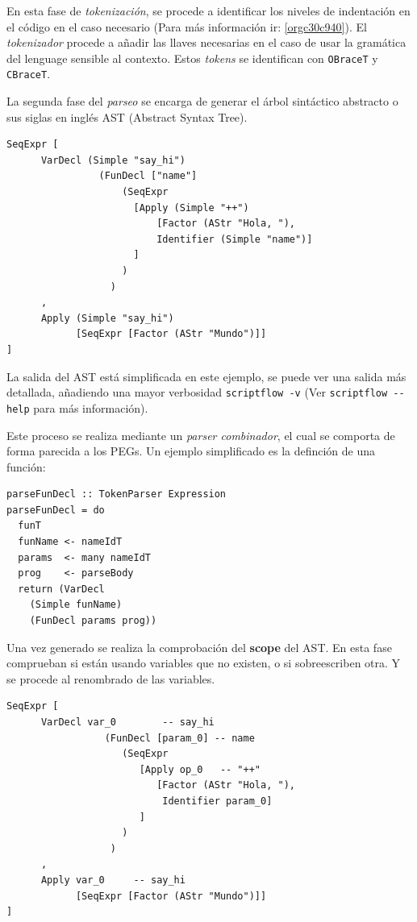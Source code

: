 \documentclass[11pt]{article}
\begin{document}
En esta fase de \emph{tokenización}, se procede a identificar los niveles de
indentación en el código en el caso necesario (Para más información ir: \ref{orgc30c940}).
El \emph{tokenizador} procede a añadir las llaves necesarias en el caso de usar la
gramática del lenguage sensible al contexto. Estos \emph{tokens} se identifican con
\texttt{OBraceT} y \texttt{CBraceT}.

La segunda fase del \emph{parseo} se encarga de generar el árbol sintáctico
abstracto o sus siglas en inglés AST (Abstract Syntax Tree).

\begin{verbatim}
SeqExpr [
      VarDecl (Simple "say_hi")
                (FunDecl ["name"]
                    (SeqExpr
                      [Apply (Simple "++")
                          [Factor (AStr "Hola, "),
                          Identifier (Simple "name")]
                      ]
                    )
                  )
      ,
      Apply (Simple "say_hi")
            [SeqExpr [Factor (AStr "Mundo")]]
]
\end{verbatim}

La salida del AST está simplificada en este ejemplo, se puede ver una salida más detallada,
añadiendo una mayor verbosidad \texttt{scriptflow -v} (Ver \texttt{scriptflow -{}-help} para más información).

Este proceso se realiza mediante un \emph{parser combinador}, el cual se comporta de
forma parecida a los PEGs. Un ejemplo simplificado es la definción de
una función:

\begin{verbatim}
parseFunDecl :: TokenParser Expression
parseFunDecl = do
  funT
  funName <- nameIdT
  params  <- many nameIdT
  prog    <- parseBody
  return (VarDecl
    (Simple funName)
    (FunDecl params prog))
\end{verbatim}

Una vez generado se realiza la comprobación del \textbf{scope} del AST. En esta fase
comprueban si están usando variables que no existen, o si sobreescriben
otra. Y se procede al renombrado de las variables.

\begin{verbatim}
SeqExpr [
      VarDecl var_0        -- say_hi
                 (FunDecl [param_0] -- name
                    (SeqExpr
                       [Apply op_0   -- "++"
                          [Factor (AStr "Hola, "),
                           Identifier param_0]
                       ]
                    )
                  )
      ,
      Apply var_0     -- say_hi
            [SeqExpr [Factor (AStr "Mundo")]]
]
\end{verbatim}
\end{document}
